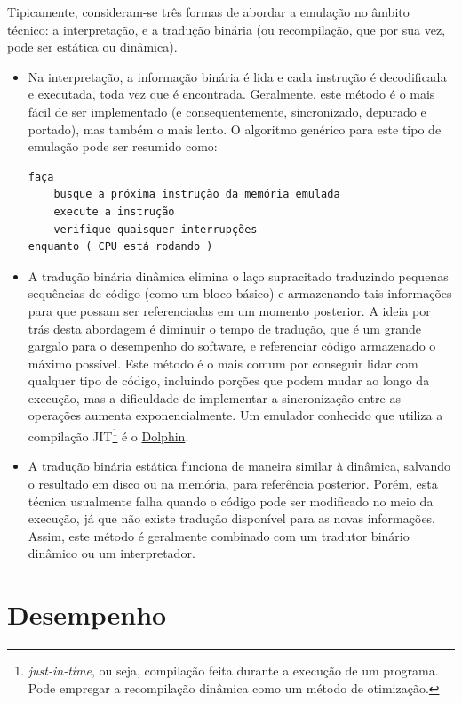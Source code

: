 \documentclass[12pt]{article}
\begin{document}
Tipicamente, consideram-se três formas de abordar a emulação no âmbito técnico:
a interpretação, e a tradução binária (ou recompilação, que por sua vez, pode
ser estática ou dinâmica).

\begin{itemize}

\item Na interpretação, a informação binária é lida e cada instrução é
decodificada e executada, toda vez que é encontrada. Geralmente, este método é
o mais fácil de ser implementado (e consequentemente, sincronizado, depurado
e portado), mas também o mais lento. O algoritmo genérico para este tipo de
emulação pode ser resumido como:

\begin{verbatim}
faça
    busque a próxima instrução da memória emulada
    execute a instrução
    verifique quaisquer interrupções
enquanto ( CPU está rodando )
\end{verbatim}

\item A tradução binária dinâmica elimina o laço supracitado traduzindo pequenas
sequências de código (como um bloco básico) e armazenando tais informações para
que possam ser referenciadas em um momento posterior. A ideia por trás desta
abordagem é diminuir o tempo de tradução, que é um grande gargalo para o
desempenho do software, e referenciar código armazenado o máximo possível. Este
método é o mais comum por conseguir lidar com qualquer tipo de código, incluindo
porções que podem mudar ao longo da execução, mas a dificuldade de implementar a
sincronização entre as operações aumenta exponencialmente. Um emulador conhecido
que utiliza a compilação JIT\footnote{\emph{just-in-time}, ou seja, compilação
feita durante a execução de um programa. Pode empregar a recompilação dinâmica
como um método de otimização.} é o \href{https://dolphin-emu.org/}{Dolphin}.

\item A tradução binária estática funciona de maneira similar à dinâmica,
salvando o resultado em disco ou na memória, para referência posterior. Porém,
esta técnica usualmente falha quando o código pode ser modificado no meio da
execução, já que não existe tradução disponível para as novas informações.
Assim, este método é geralmente combinado com um tradutor binário dinâmico ou um
interpretador.

\end{itemize}

\section{Desempenho}
\end{document}
